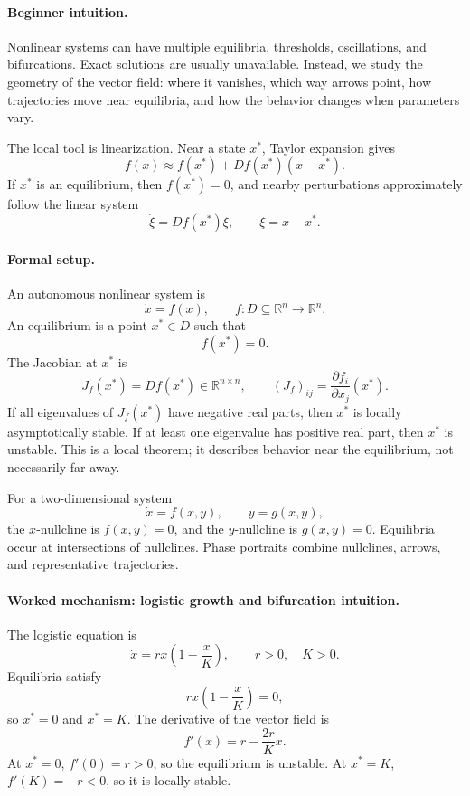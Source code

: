 \paragraph{Beginner intuition.}
Nonlinear systems can have multiple equilibria, thresholds, oscillations, and bifurcations. Exact solutions are usually unavailable. Instead, we study the geometry of the vector field: where it vanishes, which way arrows point, how trajectories move near equilibria, and how the behavior changes when parameters vary.

The local tool is linearization. Near a state \(x^*\), Taylor expansion gives
\[
f(x)\approx f(x^*)+Df(x^*)(x-x^*).
\]
If \(x^*\) is an equilibrium, then \(f(x^*)=0\), and nearby perturbations approximately follow the linear system
\[
\dot \xi=Df(x^*)\xi,
\qquad \xi=x-x^*.
\]

\paragraph{Formal setup.}
An autonomous nonlinear system is
\[
\dot x=f(x),\qquad f:D\subseteq\mathbb{R}^n\to\mathbb{R}^n.
\]
An equilibrium is a point \(x^*\in D\) such that
\[
f(x^*)=0.
\]
The Jacobian at \(x^*\) is
\[
J_f(x^*)=Df(x^*)\in\mathbb{R}^{n\times n},
\qquad
(J_f)_{ij}=\frac{\partial f_i}{\partial x_j}(x^*).
\]
If all eigenvalues of \(J_f(x^*)\) have negative real parts, then \(x^*\) is locally asymptotically stable. If at least one eigenvalue has positive real part, then \(x^*\) is unstable. This is a local theorem; it describes behavior near the equilibrium, not necessarily far away.

For a two-dimensional system
\[
\dot x=f(x,y),\qquad \dot y=g(x,y),
\]
the \(x\)-nullcline is \(f(x,y)=0\), and the \(y\)-nullcline is \(g(x,y)=0\). Equilibria occur at intersections of nullclines. Phase portraits combine nullclines, arrows, and representative trajectories.

\paragraph{Worked mechanism: logistic growth and bifurcation intuition.}
The logistic equation is
\[
\dot x=rx\left(1-\frac{x}{K}\right),
\qquad r>0,\quad K>0.
\]
Equilibria satisfy
\[
rx\left(1-\frac{x}{K}\right)=0,
\]
so \(x^*=0\) and \(x^*=K\). The derivative of the vector field is
\[
f'(x)=r-\frac{2r}{K}x.
\]
At \(x^*=0\), \(f'(0)=r>0\), so the equilibrium is unstable. At \(x^*=K\), \(f'(K)=-r<0\), so it is locally stable.

